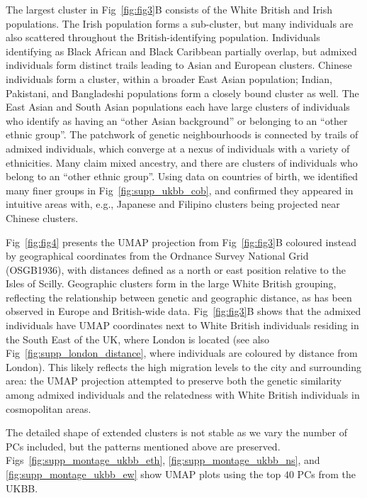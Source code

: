 The largest cluster in Fig~\ref{fig:fig3}B consists of the White British and Irish populations. The Irish population forms a sub-cluster, but many individuals are also scattered throughout the British-identifying population. Individuals identifying as Black African and Black Caribbean partially overlap, but admixed individuals form distinct trails leading to Asian and European clusters. Chinese individuals form a cluster, within a broader East Asian population; Indian, Pakistani, and Bangladeshi populations form a closely bound cluster as well. The East Asian and South Asian populations each have large clusters of individuals who identify as having an ``other Asian background'' or belonging to an ``other ethnic group''. The patchwork of genetic neighbourhoods is connected by trails of admixed individuals, which converge at a nexus of individuals with a variety of ethnicities. Many claim mixed ancestry, and there are clusters of individuals who belong to an ``other ethnic group''. Using data on countries of birth, we identified many finer groups in Fig~\ref{fig:supp_ukbb_cob}, and confirmed they appeared in intuitive areas with, e.g., Japanese and Filipino clusters being projected near Chinese clusters.

Fig~\ref{fig:fig4} presents the UMAP projection from Fig~\ref{fig:fig3}B coloured instead by geographical coordinates from the Ordnance Survey National Grid (OSGB1936), with distances defined as a north or east position relative to the Isles of Scilly. Geographic clusters form in the large White British grouping, reflecting the relationship between genetic and geographic distance, as has been observed in Europe and British-wide data\citep{novembre2008europe,leslie2015fine}. Fig~\ref{fig:fig3}B shows that the admixed individuals have UMAP coordinates next to White British individuals residing in the South East of the UK, where London is located (see also Fig~\ref{fig:supp_london_distance}, where individuals are coloured by distance from London). This likely reflects the high migration levels to the city and surrounding area: the UMAP projection attempted to preserve both the genetic similarity among admixed individuals and the relatedness with White British individuals in cosmopolitan areas. 

The detailed shape of extended clusters is not stable as we vary the number of PCs included, but the patterns mentioned above are preserved. Figs~\ref{fig:supp_montage_ukbb_eth}, \ref{fig:supp_montage_ukbb_ns}, and \ref{fig:supp_montage_ukbb_ew} show UMAP plots using the top $40$ PCs from the UKBB.

